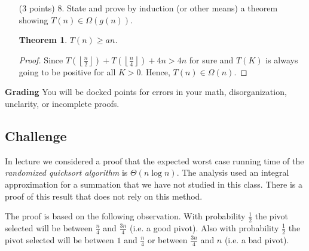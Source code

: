 \documentclass[paper=a4, fontsize=11pt]{scrartcl}
\DeclarePairedDelimiter\floor{\lfloor}{\rfloor}
\newtheorem{theorem}{Theorem}
\numberwithin{equation}{section}		%
\numberwithin{figure}{section}			%
\numberwithin{table}{section}				%
\begin{document}
\begin{enumerate}
\begin{proof}
	Inductive hypothesis: Assume $T(K)\leq bk$ for $K<n$.
	
	Inductive step: when $n > 3$,
	\begin{align*}
		T(n) &= T\left(\left\lfloor\frac{n}{2}\right\rfloor\right)+T\left(\left\lfloor\frac{n}{4}\right\rfloor\right)+4n \\
		&\leq b\floor{\frac{n}{2}} + b\floor{\frac{n}{4}} + 4n \\
		&\leq b\frac{n}{2} + b\frac{n}{4} + 4n \\
		&= \frac{3}{4}bn + 4n \\
		&\leq bn \ \ \ \ \text{ only if } b \geq 16
	\end{align*}
	
	Let $b=max\{T(3), 16\}$, so $T(n) \leq bn$ for all $n\geq 1$ by induction.
\end{proof}

\item [(3 points) 8.] State and prove by induction (or other means) a theorem showing $T(n)\in\Omega(g(n))$.
\begin{theorem}
	$T(n) \geq an$.
\end{theorem}
\begin{proof}
	Since $T\left(\left\lfloor\frac{n}{2}\right\rfloor\right)+T\left(\left\lfloor\frac{n}{4}\right\rfloor\right)+4n > 4n$ for sure and $T(K)$ is always going to be positive for all $K>0$. Hence, $T(n)\in\Omega(n)$.
\end{proof}


\end{enumerate}

\noindent\textbf{Grading} You will be docked points for errors in your math, disorganization, unclarity, or incomplete proofs. 

\newpage

\subsection{Challenge}

In lecture we considered a proof that the expected worst case running time of the \textit{randomized quicksort algorithm} is $\Theta(n\log n)$.  The analysis used an integral approximation for a summation that we have not studied in this class.  There is a proof of this result that does not rely on this method.

The proof is based on the following observation.  With probability $\frac{1}{2}$ the pivot selected will be between $\frac{n}{4}$ and $\frac{3n}{4}$ (i.e. a good pivot).  Also with probability $\frac{1}{2}$ the pivot selected will be between $1$ and $\frac{n}{4}$ or between $\frac{3n}{4}$ and $n$ (i.e. a bad pivot). 
\end{document}
